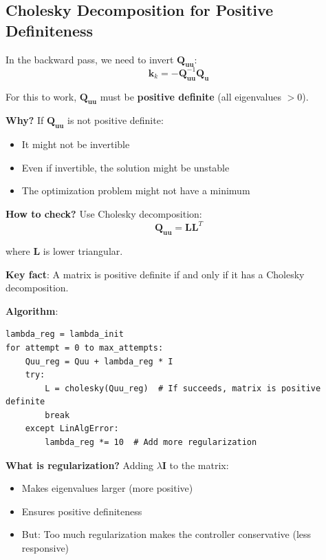 \documentclass[11pt,a4paper]{article}
\begin{document}
\subsection{Cholesky Decomposition for Positive Definiteness}

In the backward pass, we need to invert $\mathbf{Q}_{\mathbf{uu}}$:
\begin{equation}
\mathbf{k}_k = -\mathbf{Q}_{\mathbf{uu}}^{-1} \mathbf{Q}_{\mathbf{u}}
\end{equation}

For this to work, $\mathbf{Q}_{\mathbf{uu}}$ must be \textbf{positive definite} (all eigenvalues $> 0$).

\textbf{Why?} If $\mathbf{Q}_{\mathbf{uu}}$ is not positive definite:
\begin{itemize}
    \item It might not be invertible
    \item Even if invertible, the solution might be unstable
    \item The optimization problem might not have a minimum
\end{itemize}

\textbf{How to check?} Use Cholesky decomposition:
\begin{equation}
\mathbf{Q}_{\mathbf{uu}} = \mathbf{L} \mathbf{L}^T
\end{equation}

where $\mathbf{L}$ is lower triangular.

\textbf{Key fact}: A matrix is positive definite if and only if it has a Cholesky decomposition.

\textbf{Algorithm}:
\begin{verbatim}
lambda_reg = lambda_init
for attempt = 0 to max_attempts:
    Quu_reg = Quu + lambda_reg * I
    try:
        L = cholesky(Quu_reg)  # If succeeds, matrix is positive definite
        break
    except LinAlgError:
        lambda_reg *= 10  # Add more regularization
\end{verbatim}

\textbf{What is regularization?} Adding $\lambda \mathbf{I}$ to the matrix:
\begin{itemize}
    \item Makes eigenvalues larger (more positive)
    \item Ensures positive definiteness
    \item But: Too much regularization makes the controller conservative (less responsive)
\end{itemize}
\end{document}

